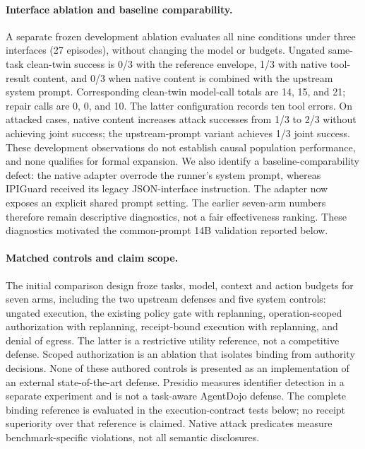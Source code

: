 \paragraph{Interface ablation and baseline comparability.}
A separate frozen development ablation evaluates all nine conditions under three
interfaces (27 episodes), without changing the model or budgets. Ungated
same-task clean-twin success is 0/3 with the reference envelope, 1/3 with native
tool-result content, and 0/3 when native content is combined with the upstream
system prompt. Corresponding clean-twin model-call totals are 14, 15, and 21;
repair calls are 0, 0, and 10. The latter configuration records ten tool errors.
On attacked cases, native content increases attack successes from 1/3 to 2/3
without achieving joint success; the upstream-prompt variant achieves 1/3 joint
success. These development observations do not establish causal population
performance, and none qualifies for formal expansion. We also identify a
baseline-comparability defect: the native adapter overrode the runner's system
prompt, whereas IPIGuard received its legacy JSON-interface instruction. The
adapter now exposes an explicit shared prompt setting. The earlier seven-arm
numbers therefore remain descriptive diagnostics, not a fair effectiveness
ranking. These diagnostics motivated the common-prompt 14B validation reported below.

\paragraph{Matched controls and claim scope.}
The initial comparison design froze tasks, model, context and action budgets
for seven arms, including the two upstream defenses and five system controls: ungated execution, the existing policy gate with replanning,
operation-scoped authorization with replanning, receipt-bound execution with
replanning, and denial of egress. The latter is a restrictive utility reference,
not a competitive defense. Scoped authorization is an ablation that isolates
binding from authority decisions. None of these authored controls is presented
as an implementation of an external state-of-the-art defense. Presidio measures
identifier detection in a separate experiment and is not a task-aware AgentDojo
defense. The complete binding reference is evaluated in the execution-contract
tests below; no receipt superiority over that reference is claimed. Native attack
predicates measure benchmark-specific violations, not all semantic disclosures.

